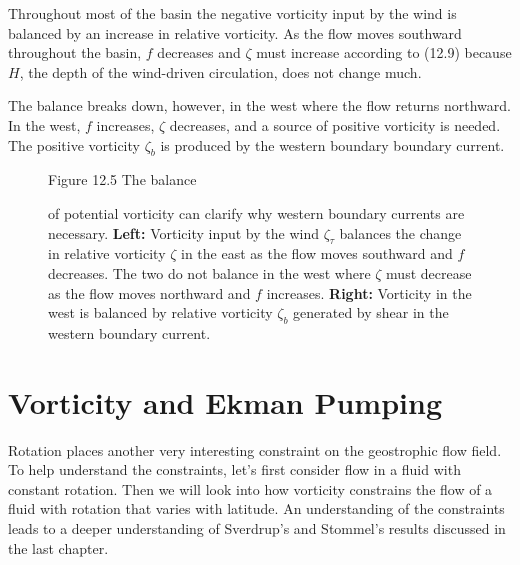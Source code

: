 Throughout most of the basin the negative vorticity input by the wind
is balanced by an increase in relative vorticity. As the flow moves
southward throughout the basin, $f$ decreases and $\zeta$ must
increase according to (12.9) because $H$, the depth of the wind-driven
circulation, does not change much.

The balance breaks down, however, in the west where the flow returns
northward. In the west, $f$ increases, $\zeta$ decreases, and a source
of positive vorticity is needed. The positive vorticity $\zeta_{b}$ is
produced by the western boundary boundary current.

\begin{figure}[t!]
\footnotesize
Figure 12.5 The balance \rule{0pt}{4ex}of potential vorticity can
clarify why western boundary currents are necessary.  \textbf{Left:}
Vorticity input by the wind $\zeta_{\tau}$ balances the change in
relative vorticity $\zeta$ in the east as the flow moves southward and
$f$ decreases. The two do not balance in the west where $\zeta$ must
decrease as the flow moves northward and $f$ increases.
\textbf{Right:} Vorticity in the west is balanced by relative
vorticity $\zeta_b$ generated by shear in the western boundary
current.
\label{fig:westbdycurrent}
\vfill
\vspace{-4ex}
\end{figure}

\section{Vorticity and Ekman Pumping}
Rotation places another very interesting
constraint on the geostrophic flow field. To help understand the
constraints, let's first consider flow in a fluid with constant
rotation. Then we will look into how vorticity constrains the flow of
a fluid with rotation that varies with latitude. An understanding of
the constraints leads to a deeper understanding of Sverdrup's and
Stommel's results discussed in the last chapter.


